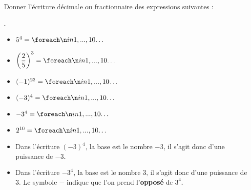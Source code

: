 \documentclass[a4paper]{book}
\begin{document}
    
    \begin{exemple}
        Donner l'écriture décimale ou fractionnaire des expressions suivantes :
        
        \medskip
        
        \begin{minipage}{0.5\linewidth}.
             \begin{itemize}[label=\textbullet]
                \item $5^4 = \points[10]$
                \medskip
                \item $\left(\dfrac{2}{5}\right)^3 = \points[10]$
                \medskip
                \item $(-1)^{23}=\points[10]$
            \end{itemize}
        \end{minipage}
        \hfill
        \begin{minipage}{0.49\linewidth}
             \begin{itemize}[label=\textbullet]
                \item $(-3)^4 = \points[10]$
                \medskip
                \item $-3^4 = \points[10]$
                \bigskip
                \item $2^{10}=\points[10]$
            \end{itemize}
        \end{minipage}
    \end{exemple}
    
    
    \begin{remarque}
        \begin{itemize}
            \item Dans l'écriture $(-3)^4$, la base est le nombre $-3$, il s'agit donc d'une puissance de $-3$.
            \item Dans l'écriture $-3^4$, la base est le nombre $3$, il s'agit donc d'une puissance de $3$. Le symbole $-$ indique que l'on prend l'\textbf{opposé} de $3^4$.
        \end{itemize}
    \end{remarque}
\end{document}

